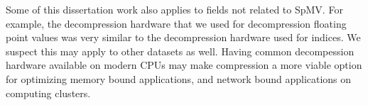 Some of this dissertation work also applies to fields not related to SpMV. For example, the decompression hardware that we used for decompression floating point values was very similar to the decompression hardware used for indices. We suspect this may apply to other datasets as well. Having common decompession hardware available on modern CPUs may make compression a more viable option for optimizing memory bound applications, and network bound applications on computing clusters.
